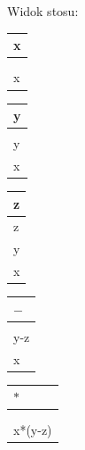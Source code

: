 \documentclass[12pt]{article}
\begin{document}
    Widok stosu:
    \begin{table}[H]
        \begin{tabular}{|p{2cm}|}
            \hline
            \textbf{x}\\
            \hline
            \hline
            \\
            \hline
            \\
            \hline
            x \\
            \hline
        \end{tabular}
        \begin{tabular}{|p{2cm}|}
            \hline
            \textbf{y}\\
            \hline
            \hline
            \\
            \hline
            y \\
            \hline
            x \\
            \hline
        \end{tabular}
        \begin{tabular}{|p{2cm}|}
            \hline
            \textbf{z}\\
            \hline
            \hline
            z \\
            \hline
            y \\
            \hline
            x \\
            \hline
        \end{tabular}
        \begin{tabular}{|p{2cm}|}
            \hline
            $\boldsymbol{-}$\\
            \hline
            \hline
            \\
            \hline
            y-z \\
            \hline
            x \\
            \hline
        \end{tabular}
        \begin{tabular}{|p{2cm}|}
            \hline
            $\boldsymbol{*}$\\
            \hline
            \hline
            \\
            \hline
            \\
            \hline
            x*(y-z)\\
            \hline
        \end{tabular}
    \end{table}
\end{document}
